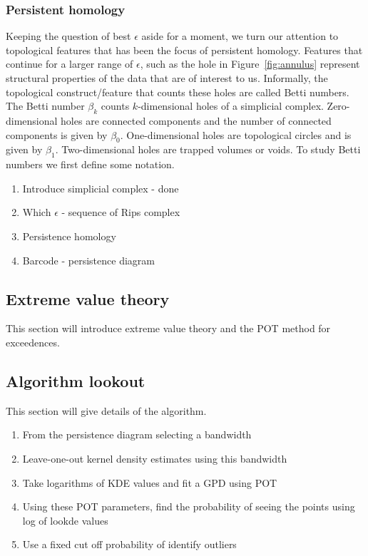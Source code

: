 \documentclass[letter,12pt]{article}
\begin{document}
\subsubsection{Persistent homology}\label{persistenthomology}
Keeping the question of best $\epsilon$ aside for a moment, we turn our attention to topological features that has been the focus of persistent homology.  Features that continue for a larger range of $\epsilon$, such as the hole in Figure~\ref{fig:annulus} represent  structural properties of the data that are of interest to us. Informally, the topological construct/feature that counts these holes are called Betti numbers. The Betti number $\beta_k$ counts $k$-dimensional holes of a  simplicial complex. Zero-dimensional holes are connected components and  the number of connected components is given by $\beta_0$.  One-dimensional holes are topological circles and is given by $\beta_1$. Two-dimensional holes are trapped volumes or voids. To study Betti numbers we first define some notation. 

\begin{enumerate}
    \item Introduce simplicial complex - done
    \item Which $\epsilon$ -  sequence of Rips complex
    \item Persistence homology
    \item Barcode - persistence diagram
\end{enumerate}
\subsection{Extreme value theory}\label{subsec:evt}
This section will introduce extreme value theory and the POT method for exceedences. 
\subsection{Algorithm lookout}\label{subsec:lookout}
This section will give details of the algorithm. 
\begin{enumerate}
    \item From the persistence diagram selecting a bandwidth
    \item Leave-one-out kernel density estimates using this bandwidth
    \item Take logarithms of KDE values and fit a GPD using POT 
    \item Using these POT parameters, find the probability of seeing the points using log of lookde values
    \item Use a fixed cut off probability of identify outliers
\end{enumerate}
\end{document}
